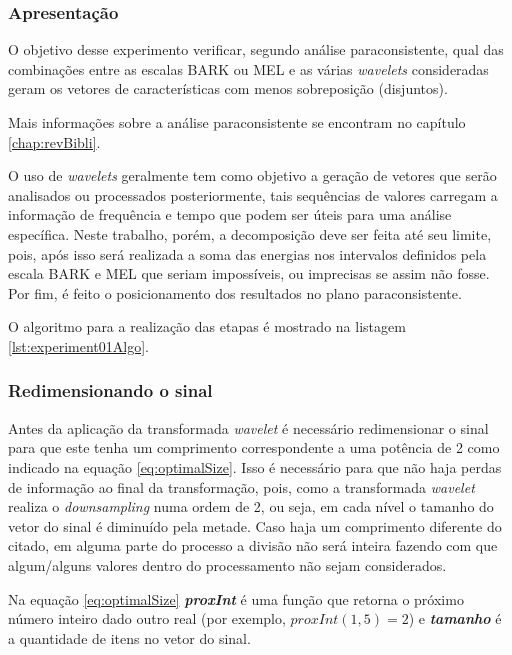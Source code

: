 \begin{myenv}{1.5}
				\subsubsection{Apresentação}
					\par O objetivo desse experimento verificar, segundo análise paraconsistente, qual das combinações entre as escalas BARK ou MEL e as várias \textit{wavelets} consideradas geram os vetores de características com menos sobreposição (disjuntos).
					
					\par Mais informações sobre a análise paraconsistente se encontram no capítulo \ref{chap:revBibli}. 
					
					\par O uso de \textit{wavelets} geralmente tem como objetivo a geração de vetores que serão analisados ou processados posteriormente, tais sequências de valores carregam a informação de frequência e tempo que podem ser úteis para uma análise específica. Neste trabalho, porém, a decomposição deve ser feita até seu limite, pois, após isso será realizada a soma das energias nos intervalos definidos pela escala BARK e MEL que seriam impossíveis, ou imprecisas se assim não fosse. Por fim, é feito o posicionamento dos resultados no plano paraconsistente.
					
					\par O algoritmo para a realização das etapas é mostrado na listagem \ref{lst:experiment01Algo}.
				
				\subsubsection{Redimensionando o sinal}
					\par Antes da aplicação da transformada \textit{wavelet} é necessário redimensionar o sinal para que este tenha um comprimento correspondente a uma potência de 2 como indicado na equação \ref{eq:optimalSize}. Isso é necessário para que não haja perdas de informação ao final da transformação, pois, como a transformada \textit{wavelet} realiza o \textit{downsampling} numa ordem de 2, ou seja, em cada nível o tamanho do vetor do sinal é diminuído pela metade. Caso haja um comprimento diferente do citado, em alguma parte do processo a divisão não será inteira fazendo com que algum/alguns valores dentro do processamento não sejam considerados.
					
					\par Na equação \ref{eq:optimalSize} \textit{\textbf{proxInt}} é uma função que retorna o próximo número inteiro dado outro real (por exemplo, $proxInt(1,5) = 2$) e \textit{\textbf{tamanho}} é a quantidade de itens no vetor do sinal.


\end{myenv}
